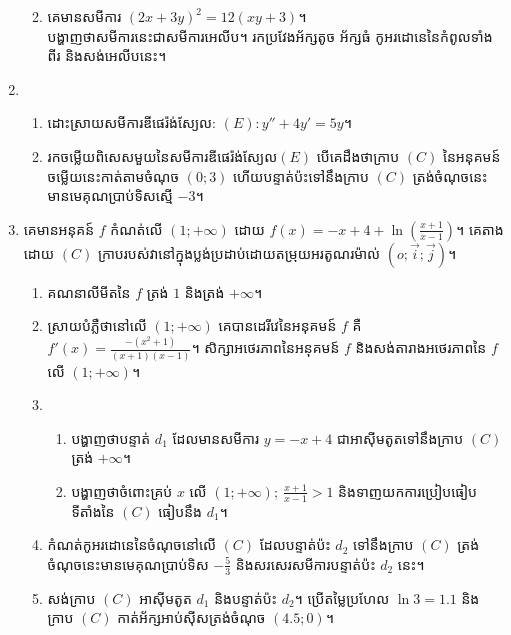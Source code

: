 \documentclass{officialexam}
\begin{document}
\begin{enumerate}[I]
\begin{enumerate}[1]
\begin{enumerate}[a]
		\end{enumerate}
		\item គេមានសមីការ $\left(2x+3y\right)^2=12\left(xy+3\right)$។\\
		បង្ហាញថាសមីការនេះជាសមីការអេលីប។ រកប្រវែងអ័ក្សតូច អ័ក្សធំ កូអរដោនេនៃកំពូលទាំងពីរ និងសង់អេលីបនេះ។
	\end{enumerate}
	\item \begin{enumerate}[a]
		\item ដោះស្រាយសមីការឌីផេរ៉ង់ស្យែល: $\left(E\right):y''+4y'=5y$។
		\item រកចម្លើយពិសេសមួយនៃសមីការឌីផេរ៉ង់ស្យែល​ $\left(E\right)$ បើគេដឹងថាក្រាប $\left(C\right)$ នៃអនុគមន៍ចម្លើយនេះកាត់តាមចំណុច $\left(0;3\right)$ ហើយបន្ទាត់ប៉ះទៅនឹងក្រាប $\left(C\right)$ ត្រង់ចំណុចនេះមានមេគុណប្រាប់ទិសស្មើ $-3$។
	\end{enumerate}
	\item គេមានអនុគន៍ $f$ កំណត់លើ $\left(1;+\infty\right)$ ដោយ $f(x)=-x+4+\ln\left(\frac{x+1}{x-1}\right)$។ គេតាងដោយ $\left(C\right)$ ក្រាបរបស់វានៅក្នុងប្លង់ប្រដាប់ដោយតម្រុយអរតូណរម៉ាល់ $\left(o;\vec{i};\vec{j}\right)$។
	\begin{enumerate}[1]
		\item គណនាលីមីតនៃ $f$ ត្រង់ $1$ និងត្រង់ $+\infty$។
		\item ស្រាយបំភ្លឺថានៅលើ $\left(1;+\infty\right)$ គេបានដេរីវេនៃអនុគមន៍ $f$ គឺ $f'(x)=\frac{-\left(x^2+1\right)}{\left(x+1\right)\left(x-1\right)}$។ សិក្សាអថេរភាពនៃអនុគមន៍ $f$ និងសង់តារាងអថេរភាពនៃ $f$ លើ $\left(1;+\infty\right)$។
		\item \begin{enumerate}[a]
			\item បង្ហាញថាបន្ទាត់ $d_1$ ដែលមានសមីការ $y=-x+4$ ជាអាសុីមតូតទៅនឹងក្រាប $\left(C\right)$ ត្រង់ $+\infty$។
			\item បង្ហាញថាចំពោះគ្រប់ $x$ លើ $\left(1;+\infty\right);~\frac{x+1}{x-1}>1$ និងទាញយកការប្រៀបធៀបទីតាំងនៃ $\left(C\right)$ ធៀបនឹង $d_1$។ 
		\end{enumerate}\newpage
		\item កំណត់កូអរដោនេនៃចំណុចនៅលើ $\left(C\right)$ ដែលបន្ទាត់ប៉ះ $d_2$ ទៅនឹងក្រាប $\left(C\right)$ ត្រង់ចំណុចនេះមានមេគុណប្រាប់ទិស $-\frac{5}{3}$ និងសរសេរសមីការបន្ទាត់ប៉ះ $d_2$ នេះ។
		\item សង់ក្រាប $\left(C\right)$ អាសុីមតូត $d_1$ និងបន្ទាត់ប៉ះ $d_2$។ ប្រើតម្លៃប្រហែល $\ln3=1.1$ និងក្រាប $\left(C\right)$ កាត់អ័ក្សអាប់សុីសត្រង់ចំណុច $\left(4.5;0\right)$។
	\end{enumerate}
\end{enumerate}
\end{document}

